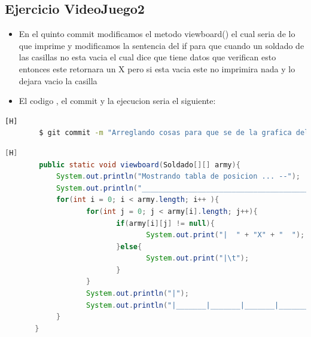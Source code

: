 \documentclass{article}
\begin{document}
	\subsection{Ejercicio VideoJuego2}
	\begin{itemize}	
		\item En el quinto commit modificamos el metodo viewboard() el cual seria de lo que imprime y modificamos la sentencia del if para que cuando un soldado de las casillas no esta vacia el cual dice que tiene datos que verifican esto entonces este retornara un X pero si esta vacia este no imprimira nada y lo dejara vacio la casilla 
		\item El codigo , el commit y la ejecucion seria el siguiente:
	\end{itemize}	
	\begin{lstlisting}[language=bash,caption={Commit}][H]
		$ git commit -m "Arreglando cosas para que se de la grafica del tableroen esto esta cambiar la condicion para que cuando esta sea null 65265206"
	\end{lstlisting}	
	\begin{lstlisting}[language=java,caption={Las lineas de codigos del metodo creado:}][H]
		public static void viewboard(Soldado[][] army){
			System.out.println("Mostrando tabla de posicion ... --");
			System.out.println("_________________________________________________________________________________");
			for(int i = 0; i < army.length; i++ ){
				   for(int j = 0; j < army[i].length; j++){
						  if(army[i][j] != null){
								 System.out.print("|  " + "X" + "  ");
						  }else{
								 System.out.print("|\t");
						  }
				   }
				   System.out.println("|");
				   System.out.println("|_______|_______|_______|_______|_______|_______|_______|_______|_______|_______|");
			}
	   }
	\end{lstlisting}
\end{document}
